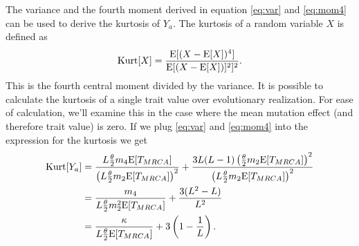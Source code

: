The variance and the fourth moment derived in equation \eqref{eq:var} and
\eqref{eq:mom4} can be used to derive the kurtosis of $Y_a$. The kurtosis of a
random variable $X$ is defined as
\begin{equation*}
  \mathrm{Kurt}[X]=\frac{\mathrm{E}[(X-\mathrm{E}[X])^4]}{\mathrm{E}[(X-\mathrm{E}[X])]^2]^2}.
\end{equation*}
This is the fourth central moment divided by the variance. It is possible to
calculate the kurtosis of a single trait value over evolutionary realization.
For ease of calculation, we'll examine this in the case where the mean mutation
effect (and therefore trait value) is zero. If we plug \eqref{eq:var} and
\eqref{eq:mom4} into the expression for the kurtosis we get
\begin{align*}
  \mathrm{Kurt}[Y_a] &= \frac{L\frac{\theta}{2} m_4 \mathrm{E}[T_{MRCA}]}{\left(L\frac{\theta}{2} m_2 \mathrm{E}[T_{MRCA}]\right)^2} +
  \frac{3L(L-1)\left( \frac{\theta}{2} m_2  \mathrm{E}[T_{MRCA}]\right)^2}{\left(L\frac{\theta}{2} m_2 \mathrm{E}[T_{MRCA}]\right)^2} \nonumber \\
  &= \frac{m_4}{L\frac{\theta}{2} m_2^2\mathrm{E}[T_{MRCA}]} + \frac{3(L^2-L)}{L^2} \nonumber \\
  &= \frac{\kappa}{L\frac{\theta}{2} \mathrm{E}[T_{MRCA}]} + 3\left( 1 - \frac{1}{L} \right).
\end{align*}

